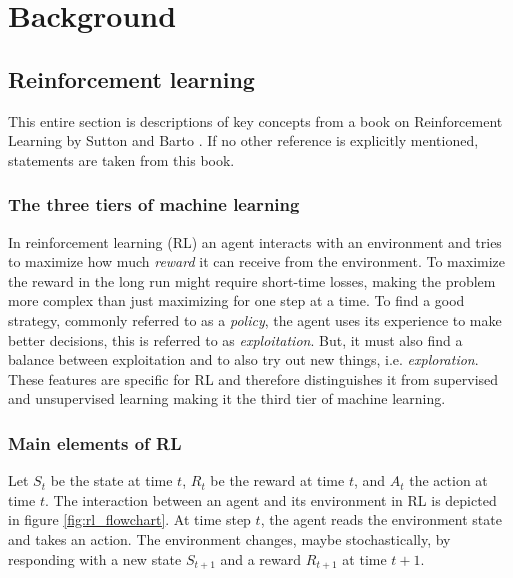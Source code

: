 \chapter{Background}
\label{sec:background}

\section{Reinforcement learning}

This entire section is descriptions of key concepts from a book on
Reinforcement Learning by Sutton and Barto \cite{sutton1998reinforcement}. If
no other reference is explicitly mentioned, statements are taken from this
book.

\subsection{The three tiers of machine learning}

In reinforcement learning (RL) an agent interacts with an environment and tries
to maximize how much \textit{reward} it can receive from the environment. To
maximize the reward in the long run might require short-time losses, making the
problem more complex than just maximizing for one step at a time. To find a
good strategy, commonly referred to as a \textit{policy}, the agent uses its
experience to make better decisions, this is referred to as
\textit{exploitation}. But, it must also find a balance between exploitation
and to also try out new things, i.e. \textit{exploration}. These features are
specific for RL and therefore distinguishes it from supervised and unsupervised
learning making it the third tier of machine learning.

\subsection{Main elements of RL}

Let $S_t$ be the state at time $t$, $R_t$ be the reward at time $t$, and $A_t$
the action at time $t$. The interaction between an agent and its environment in
RL is depicted in figure \ref{fig:rl_flowchart}. At time step $t$, the agent
reads the environment state and takes an action. The environment changes, maybe
stochastically, by responding with a new state $S_{t+1}$ and a reward $R_{t+1}$
at time $t+1$. 

